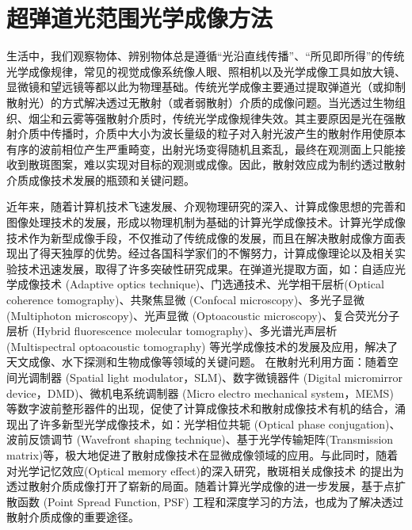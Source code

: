 
\chapter{超弹道光范围光学成像方法}
生活中，我们观察物体、辨别物体总是遵循“光沿直线传播”、“所见即所得”的传统光学成像规律，常见的视觉成像系统像人眼、照相机以及光学成像工具如放大镜、显微镜和望远镜等都以此为物理基础。传统光学成像主要通过提取弹道光（或抑制散射光）的方式解决透过无散射（或者弱散射）介质的成像问题。当光透过生物组织、烟尘和云雾等强散射介质时，传统光学成像规律失效。其主要原因是光在强散射介质中传播时，介质中大小为波长量级的粒子对入射光波产生的散射作用使原本有序的波前相位产生严重畸变，出射光场变得随机且紊乱，最终在观测面上只能接收到散斑图案，难以实现对目标的观测或成像。因此，散射效应成为制约透过散射介质成像技术发展的瓶颈和关键问题。

近年来，随着计算机技术飞速发展、介观物理研究的深入、计算成像思想的完善和图像处理技术的发展，形成以物理机制为基础的计算光学成像技术。计算光学成像技术作为新型成像手段，不仅推动了传统成像的发展，而且在解决散射成像方面表现出了得天独厚的优势。经过各国科学家们的不懈努力，计算成像理论以及相关实验技术迅速发展，取得了许多突破性研究成果。在弹道光提取方面，如：自适应光学成像技术 (Adaptive optics technique)、门选通技术、光学相干层析(Optical coherence tomography)\cite{huang_optical_1991}、共聚焦显微 (Confocal microscopy)\cite{webb_confocal_1996}、多光子显微 (Multiphoton microscopy)\cite{denk_two_photon_1990,helmchen_deep_2005}、光声显微 (Optoacoustic microscopy)\cite{zhang_functional_2006,wang_multiscale_2009}、复合荧光分子层析 (Hybrid fluorescence molecular tomography)\cite{ale_fmt_xct_2012}、多光谱光声层析 (Multispectral optoacoustic tomography)\cite{razansky_volumetric_2011,ntziachristos_going_2010} 等光学成像技术的发展及应用，解决了天文成像、水下探测和生物成像等领域的关键问题。
在散射光利用方面：随着空间光调制器 (Spatial light modulator，SLM)、数字微镜器件 (Digital micromirror device，DMD)、微机电系统调制器 (Micro electro mechanical system，MEMS) 等数字波前整形器件的出现，促使了计算成像技术和散射成像技术有机的结合，涌现出了许多新型光学成像技术，如：光学相位共轭 (Optical phase conjugation)\cite{yaqoob_optical_2008}、波前反馈调节 (Wavefront shaping technique)\cite{Vellekoop2007,vellekoop_exploiting_2010,conkey_genetic_2012,blochet_fast_2017}、基于光学传输矩阵(Transmission matrix)\cite{Popoff2010}等，极大地促进了散射成像技术在显微成像领域的应用。与此同时，随着对光学记忆效应(Optical memory effect)\cite{Freund1988}的深入研究，散斑相关成像技术 的提出为透过散射介质成像打开了崭新的局面。随着计算光学成像的进一步发展，基于点扩散函数 (Point Spread Function, PSF) 工程\cite{sahoo_single-shot_2017}和深度学习\cite{li_deep_2018}的方法，也成为了解决透过散射介质成像的重要途径。


